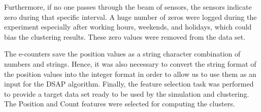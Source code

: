 Furthermore, if no one passes through the beam of sensors, the sensors indicate zero during that specific interval. A huge number of zeros were logged during the experiment especially after working hours, weekends, and holidays, which could bias the clustering results. These zero values were removed from the data set. 

The e-counters save the position values as a string character combination of numbers and strings. Hence, it was also necessary to convert the string format of the position values into the integer format in order to allow us to use them as an input for the DSAP algorithm. 
Finally, the feature selection task was performed to provide a target data set ready to be used by the simulation and clustering. The Position and Count features were selected for computing the clusters.%








